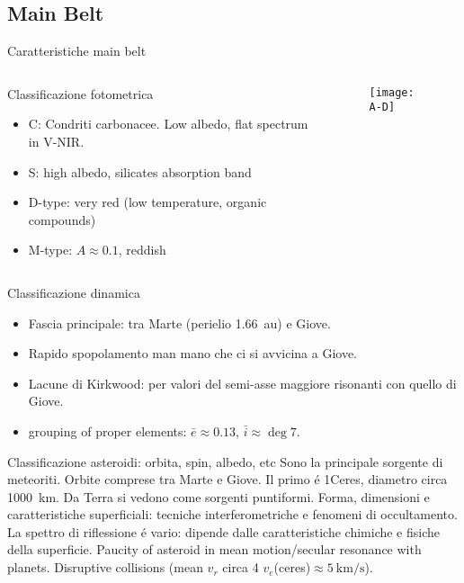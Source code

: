 \subsection{Main Belt}

\begin{frame}{Caratteristiche main belt}
\begin{columns}[T]\begin{column}{0.5\textwidth}
\begin{block}{Classificazione fotometrica}
\begin{itemize}
    \item C: Condriti carbonacee. Low albedo, flat spectrum in V-NIR.
    \item S: high albedo, silicates absorption band
    \item D-type: very red (low temperature, organic compounds)
    \item M-type: $A\approx0.1$, reddish
\end{itemize}
\end{block}
\end{column}\begin{column}{0.5\textwidth}
\begin{figure}[!ht]\texttt{[image: A-D]}\end{figure}
\end{column} \end{columns}
\begin{block}{Classificazione dinamica}
\begin{itemize}
\item Fascia principale: tra Marte (perielio \SI{1.66}{\astronomicalunit}) e Giove.
\item Rapido spopolamento man mano che ci si avvicina a Giove.
\item Lacune di Kirkwood: per valori del semi-asse maggiore risonanti con quello di Giove.
\item grouping of proper elements: $\bar{e}\approx0.13$, $\bar{i}\approx\deg{7}$.
\end{itemize}
\end{block}
\end{frame}

\begin{wordonframe}{Classificazione asteroidi: orbita, spin, albedo, etc}
Sono la principale sorgente di meteoriti.
Orbite comprese tra Marte e Giove. Il primo \'e 1Ceres, diametro circa \SI{1000}{\kilo\meter}.
Da Terra si vedono come sorgenti puntiformi. Forma, dimensioni e caratteristiche superficiali: tecniche interferometriche e fenomeni di occultamento.
La spettro di riflessione \'e vario: dipende dalle caratteristiche chimiche e fisiche della superficie.
Paucity of asteroid in mean motion/secular resonance with planets.
Disruptive collisions (mean $v_r$ circa 4 $v_e$(ceres)$\approx\SI{5}{\kilo\meter\per\second}$).
\end{wordonframe}

